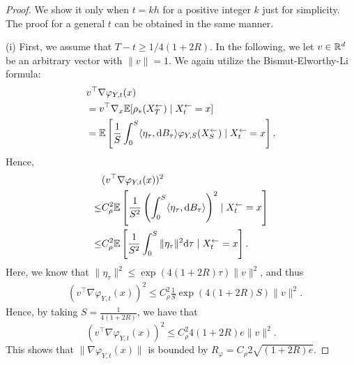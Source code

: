 \begin{proof}
We show it only when $t = kh$ for a positive integer $k$ just for simplicity. The proof for a general $t$ can be obtained in the same manner. 

(i) First, we assume that $T - t \geq 1/4(1 + 2R)$. 
In the following, we let $v \in {\mathbb{R}}^d$ be an arbitrary vector with $\|v\| =1$. 
We again utilize the Bismut-Elworthy-Li formula: 
\begin{align} 
& v^\top \nabla \varphi_{Y,t}(x) \\
& = v^\top \nabla_x \mathbb{E}[\rho_*({X}_{T}^\leftarrow) \mid {X}_{t}^\leftarrow = x]   \\
& =  \mathbb{E}\left[ \frac{1}{S}\int_{0}^S \langle \eta_\tau, {\textnormal{d}} B_\tau \rangle \varphi_{Y,S}({X}_{S}^\leftarrow) \mid {X}_{t}^\leftarrow = x\right].
\end{align}
Hence, 
\begin{align} 
& (v^\top \nabla \varphi_{Y,t}(x))^2 \\
\leq & 
 C_\rho^2 \mathbb{E}\left[ \frac{1}{S^2} \left( \int_{0}^S \langle \eta_\tau, {\textnormal{d}} B_\tau \rangle \right)^2
 \mid {X}_{t}^\leftarrow = x\right]  \\
\leq & 
 C_\rho^2 \mathbb{E}\left[ \frac{1}{S^2} \int_{0}^S \|\eta_\tau\|^2 {\textnormal{d}} \tau 
 \mid {X}_{t}^\leftarrow = x\right].
\end{align}
Here, we know that $\|\eta_\tau\|^2 \leq \exp(4(1+2R)\tau) \|v\|^2$, and thus 
\begin{align} 
& (v^\top \nabla \varphi_{Y,t}(x))^2 \leq C_\rho^2 \frac{1}{S} \exp(4(1+2R)S) \|v\|^2.
\end{align}
Hence, by taking $S = \frac{1}{4(1+2R)}$, we have that 
$$
(v^\top \nabla \varphi_{Y,t}(x))^2 \leq C_\rho^2 4(1+2R) e \|v\|^2. 
$$
This shows that $\|\nabla \varphi_{Y,t}(x)\|$ is bounded by $R_\varphi =  C_\rho 2\sqrt{(1+2R) e}$. 


\end{proof}

